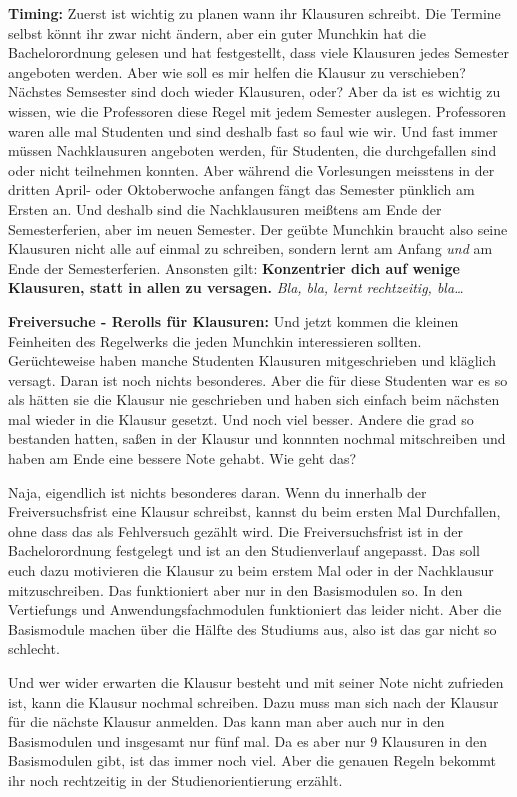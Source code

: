 \textbf{Timing:}
Zuerst ist wichtig zu planen wann ihr Klausuren schreibt.
Die Termine selbst k\"onnt ihr zwar nicht \"andern, aber ein guter Munchkin hat die Bachelorordnung gelesen
und hat festgestellt, dass viele Klausuren jedes Semester angeboten werden. Aber wie soll es mir helfen die Klausur zu verschieben?
N\"achstes Semsester sind doch wieder Klausuren, oder? Aber da ist es wichtig
zu wissen, wie die Professoren diese Regel mit jedem Semester auslegen.
Professoren waren alle mal Studenten und sind deshalb fast so faul wie wir.
Und fast immer m\"ussen Nachklausuren angeboten werden, f\"ur Studenten, die durchgefallen sind oder nicht teilnehmen konnten.
Aber w\"ahrend die Vorlesungen meisstens in der dritten April- oder Oktoberwoche anfangen f\"angt das Semester p\"unklich am Ersten an.
Und deshalb sind die Nachklausuren mei{\ss}tens am Ende der Semesterferien, aber im neuen Semester. Der
ge\"ubte Munchkin braucht also seine Klausuren nicht alle auf einmal zu
schreiben, sondern lernt am Anfang \emph{und} am Ende der Semesterferien.
Ansonsten gilt: \textbf{Konzentrier dich auf wenige Klausuren, statt in allen zu versagen.}
\emph{Bla, bla, lernt rechtzeitig, bla\dots}

\textbf{Freiversuche - Rerolls f\"ur Klausuren:}
Und jetzt kommen die kleinen Feinheiten des Regelwerks die jeden Munchkin interessieren sollten.
Ger\"uchteweise haben manche Studenten Klausuren mitgeschrieben und kl\"aglich versagt. Daran ist noch nichts besonderes.
Aber die f\"ur diese Studenten war es so als h\"atten sie die Klausur nie
geschrieben und haben sich einfach beim n\"achsten mal wieder in die Klausur
gesetzt. Und noch viel besser. Andere die grad so bestanden hatten, sa{\ss}en
in der Klausur und konnnten nochmal mitschreiben und haben am Ende eine bessere
Note gehabt. Wie geht das?

Naja, eigendlich ist nichts besonderes daran. Wenn du innerhalb der
Freiversuchsfrist eine Klausur schreibst, kannst du beim ersten Mal
Durchfallen, ohne dass das als Fehlversuch gez\"ahlt wird.
Die Freiversuchsfrist ist in der Bachelorordnung festgelegt und ist an den Studienverlauf angepasst.
Das soll euch dazu motivieren die Klausur zu beim erstem Mal oder in der Nachklausur mitzuschreiben.
Das funktioniert aber nur in den Basismodulen so. In den Vertiefungs und Anwendungsfachmodulen funktioniert das leider nicht.
Aber die Basismodule machen \"uber die H\"alfte des Studiums aus, also ist das gar nicht so schlecht.

Und wer wider erwarten die Klausur besteht und mit seiner Note nicht zufrieden
ist, kann die Klausur nochmal schreiben. Dazu muss man sich nach der Klausur
f\"ur die n\"achste Klausur anmelden. Das kann man aber auch nur in den
Basismodulen und insgesamt nur f\"unf mal. Da es aber nur 9 Klausuren in den Basismodulen gibt,
ist das immer noch viel. Aber die genauen Regeln bekommt ihr noch rechtzeitig in der Studienorientierung erz\"ahlt.

